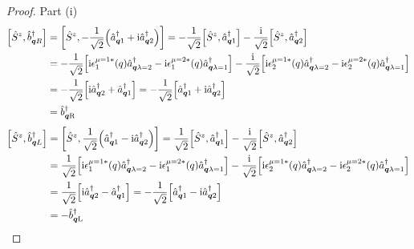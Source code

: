 \documentclass[letterpaper]{article}
\theoremstyle{definition}
\begin{document}
\begin{proof}Part (i)
  \begin{align*}
    \bqty{\hat{S}^z,\hat{b}^\dagger_{\vb*{q}R}} & =\bqty{\hat{S}^z,-\frac{1}{\sqrt{2}}\pqty{\hat{a}^\dagger_{\vb*{q}1}+\text{i}\hat{a}^\dagger_{\vb*{q}2}}}=-\frac{1}{\sqrt{2}}\bqty{\hat{S}^z,\hat{a}^\dagger_{\vb*{q}1}}-\frac{\text{i}}{\sqrt{2}}\bqty{\hat{S}^z,\hat{a}^\dagger_{\vb*{q}2}}                                                                                  \\
                                                & =-\frac{1}{\sqrt{2}}\bqty{\text{i}\epsilon^{\mu=1*}_1(q)\hat{a}^\dagger_{\vb*{q}\lambda=2}-\text{i}\epsilon^{\mu=2*}_1(q)\hat{a}^\dagger_{\vb*{q}\lambda=1}}-\frac{\text{i}}{\sqrt{2}}\bqty{\text{i}\epsilon^{\mu=1*}_2(q)\hat{a}^\dagger_{\vb*{q}\lambda=2}-\text{i}\epsilon^{\mu=2*}_2(q)\hat{a}^\dagger_{\vb*{q}\lambda=1}} \\
                                                & =-\frac{1}{\sqrt{2}}\bqty{\text{i}\hat{a}^\dagger_{\vb*{q}2}+\hat{a}^\dagger_{\vb*{q}1}}=-\frac{1}{\sqrt{2}}\bqty{\hat{a}^\dagger_{\vb*{q}1}+\text{i}\hat{a}^\dagger_{\vb*{q}2}}                                                                                                                                               \\
                                                & =\hat{b}^\dagger_{\vb*{q}\text{R}}
  \end{align*}
  \begin{align*}
    \bqty{\hat{S}^z,\hat{b}^\dagger_{\vb*{q}L}} & =\bqty{\hat{S}^z,\frac{1}{\sqrt{2}}\pqty{\hat{a}^\dagger_{\vb*{q}1}-\text{i}\hat{a}^\dagger_{\vb*{q}2}}}=\frac{1}{\sqrt{2}}\bqty{\hat{S}^z,\hat{a}^\dagger_{\vb*{q}1}}-\frac{\text{i}}{\sqrt{2}}\bqty{\hat{S}^z,\hat{a}^\dagger_{\vb*{q}2}}                                                                                   \\
                                                & =\frac{1}{\sqrt{2}}\bqty{\text{i}\epsilon^{\mu=1*}_1(q)\hat{a}^\dagger_{\vb*{q}\lambda=2}-\text{i}\epsilon^{\mu=2*}_1(q)\hat{a}^\dagger_{\vb*{q}\lambda=1}}-\frac{\text{i}}{\sqrt{2}}\bqty{\text{i}\epsilon^{\mu=1*}_2(q)\hat{a}^\dagger_{\vb*{q}\lambda=2}-\text{i}\epsilon^{\mu=2*}_2(q)\hat{a}^\dagger_{\vb*{q}\lambda=1}} \\
                                                & =\frac{1}{\sqrt{2}}\bqty{\text{i}\hat{a}^\dagger_{\vb*{q}2}-\hat{a}^\dagger_{\vb*{q}1}}=-\frac{1}{\sqrt{2}}\bqty{\hat{a}^\dagger_{\vb*{q}1}-\text{i}\hat{a}^\dagger_{\vb*{q}2}}                                                                                                                                               \\
                                                & =-\hat{b}^\dagger_{\vb*{q}\text{L}}
  \end{align*}
\end{proof}
\end{document}
